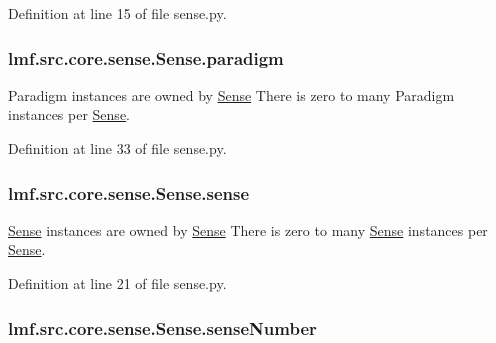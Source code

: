 Definition at line 15 of file sense.\+py.

\hypertarget{classlmf_1_1src_1_1core_1_1sense_1_1_sense_a3f36a95173e4d4e7244e407a725dd3a9}{
\subsubsection[{paradigm}]{\setlength{\rightskip}{0pt plus 5cm}lmf.\+src.\+core.\+sense.\+Sense.\+paradigm}}\label{classlmf_1_1src_1_1core_1_1sense_1_1_sense_a3f36a95173e4d4e7244e407a725dd3a9}


Paradigm instances are owned by \hyperlink{classlmf_1_1src_1_1core_1_1sense_1_1_sense}{Sense} There is zero to many Paradigm instances per \hyperlink{classlmf_1_1src_1_1core_1_1sense_1_1_sense}{Sense}. 



Definition at line 33 of file sense.\+py.

\hypertarget{classlmf_1_1src_1_1core_1_1sense_1_1_sense_a51524fd8eb1bc869c2ecfc681339d8aa}{
\subsubsection[{sense}]{\setlength{\rightskip}{0pt plus 5cm}lmf.\+src.\+core.\+sense.\+Sense.\+sense}}\label{classlmf_1_1src_1_1core_1_1sense_1_1_sense_a51524fd8eb1bc869c2ecfc681339d8aa}


\hyperlink{classlmf_1_1src_1_1core_1_1sense_1_1_sense}{Sense} instances are owned by \hyperlink{classlmf_1_1src_1_1core_1_1sense_1_1_sense}{Sense} There is zero to many \hyperlink{classlmf_1_1src_1_1core_1_1sense_1_1_sense}{Sense} instances per \hyperlink{classlmf_1_1src_1_1core_1_1sense_1_1_sense}{Sense}. 



Definition at line 21 of file sense.\+py.

\hypertarget{classlmf_1_1src_1_1core_1_1sense_1_1_sense_ab511b70da3012cc5a0254f34dd30170c}{
\subsubsection[{sense\+Number}]{\setlength{\rightskip}{0pt plus 5cm}lmf.\+src.\+core.\+sense.\+Sense.\+sense\+Number}}\label{classlmf_1_1src_1_1core_1_1sense_1_1_sense_ab511b70da3012cc5a0254f34dd30170c}


